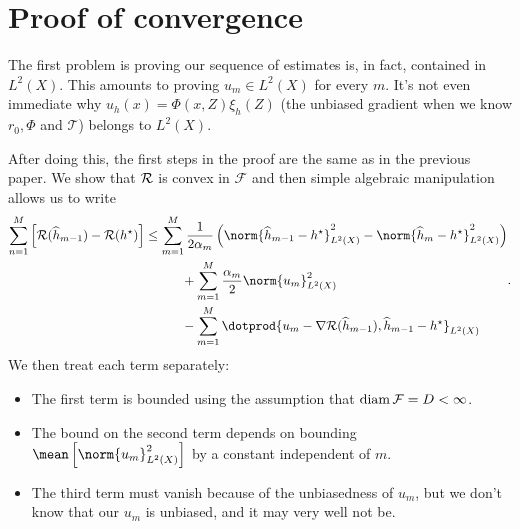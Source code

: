 \section{Proof of convergence}

The first problem is proving our sequence of estimates is, in fact, contained in $ L^{ 2 } ( X ) $.
This amounts to proving $ u_{ m } \in L^{ 2 } ( X ) $ for every $ m $.
It's not even immediate why $ u_{ h } ( x ) = \Phi ( x, Z ) \xi_{ h } ( Z ) $ (the unbiased gradient when we know $ r_{ 0 }, \Phi $ and $ \mathcal{T} $) belongs to $ L^{ 2 } ( X ) $.

After doing this, the first steps in the proof are the same as in the previous paper.
We show that $ \mathcal{R} $ is convex in $ \mathcal{F} $ and then simple algebraic manipulation allows us to write
\begin{align*}
    \begin{split}
        \sum_{ n=1 }^{ M } \left[
            \risk ( \hat{ h }_{ m-1 } ) - \risk ( \hstar )
        \right]
        &\leq \sum_{ m=1 }^{ M } \frac{ 1 }{ 2 \alpha_{ m } } \left(
            \norm{ \hat{ h }_{ m-1 } - \hstar }^2_{ L^{ 2 } ( X ) }
            -
            \norm{ \hat{ h }_{ m } - \hstar }^2_{ L^{ 2 } ( X ) }
        \right) \\
        &\hspace{1cm} + \sum_{ m=1 }^{ M } \frac{ \alpha_{ m } }{ 2 } \norm{ u_{ m } }^2_{ L^{ 2 } ( X ) } \\
        &\hspace{1cm} - \sum_{ m=1 }^{ M }
        \dotprod{ u_{ m } - \nabla \risk ( \hat{ h }_{ m-1 } ), \hat{ h }_{ m-1 } - \hstar }_{ L^{ 2 } ( X ) }
    \end{split}
.\end{align*}
We then treat each term separately:
\begin{itemize}
    \item The first term is bounded using the assumption that $ \operatorname{diam} \mathcal{F} = D < \infty $.
    \item The bound on the second term depends on bounding $ \mean \left[ \norm{ u_{ m } }^2_{ L^{ 2 } ( X ) } \right] $ by a constant independent of $ m $.
    \item The third term must vanish because of the unbiasedness of $ u_{ m } $, but we don't know that our $ u_{ m } $ is unbiased, and it may very well not be.
\end{itemize}

